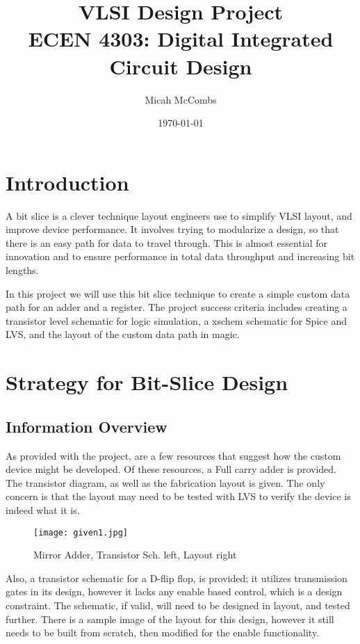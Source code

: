\documentclass{article}
\title{VLSI Design Project \\ ECEN 4303: Digital Integrated Circuit Design}
\author{Micah McCombs}
\date{\today}
\begin{document}
\maketitle
\section{Introduction}

A bit slice is a clever technique layout engineers use to simplify VLSI layout, and improve device performance. It involves trying to modularize a design, so that there is an easy path for data to travel through. This is almost essential for innovation and to ensure performance in total data throughput and increasing bit lengths.

In this project we will use this bit slice technique to create a simple custom data path for an adder and a register. The project success criteria includes creating a transistor level schematic for logic simulation, a xschem schematic for Spice and LVS, and the layout of the custom data path in magic.


\section{Strategy for Bit-Slice Design}

\subsection{Information Overview}
As provided with the project, are a few resources that suggest how the custom device might be developed. Of these resources, a Full carry adder is provided. The transistor diagram, as well as the fabrication layout is given. The only concern is that the layout may need to be tested with LVS to verify the device is indeed what it is.
\newline

\begin{figure}[H]
    \centering
    \texttt{[image: given1.jpg]}
    \caption{Mirror Adder, Transistor Sch. left, Layout right }
    \label{fig:given1}
\end{figure}


Also, a transistor schematic for a D-flip flop, is provided; it utilizes transmission gates in its design, however it lacks any enable based control, which is a design constraint. The schematic, if valid, will need to be designed in layout, and tested further. There is a sample image of the layout for this design, however it still needs to be built from scratch, then modified for the enable functionality. 
\end{document}
